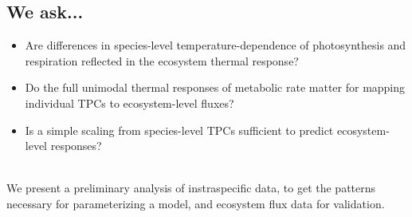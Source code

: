 \documentclass[25pt,margin=18mm, innermargin=12mm]{tikzposter}
\begin{document}
{\begin{minipage}[]{0.52\linewidth}
    \vspace{-10pt}
    \subsection*{We ask...}
  
    \begin{itemize} \itemsep5pt 
    \item Are differences in species-level temperature-dependence of photosynthesis and respiration reflected in the ecosystem thermal response? 
    \item Do the full unimodal thermal responses of metabolic rate matter for mapping individual TPCs to ecosystem-level fluxes?
    \item Is a simple scaling from species-level TPCs sufficient to predict ecosystem-level responses?
    \end{itemize}\\


        \vspace{10pt}
   We present a preliminary analysis of instraspecific data, to get the patterns necessary for parameterizing a model, and ecosystem flux data for validation.
    \end{minipage}
  
}
\end{document}
